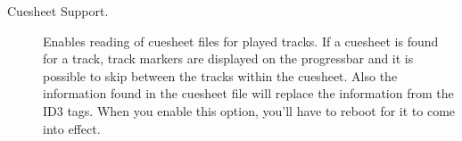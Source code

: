 \begin{description}
\item[Cuesheet Support.]
  Enables reading of cuesheet files for played tracks. If a cuesheet is found
  for a track, track markers are displayed on the progressbar and it is
  possible to skip between the tracks within the cuesheet. Also the information
  found in the cuesheet file will replace the information from the ID3 tags.
  When you enable this option, you'll have to reboot for it to come into
  effect.

\end{description}
